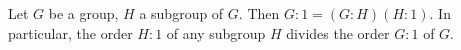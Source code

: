 Let $G$ be a group, $H$ a subgroup of $G$. Then $G:1 = (G:H)(H:1)$. In particular, the order $H:1$ of any subgroup $H$ divides the order $G:1$ of $G$.
